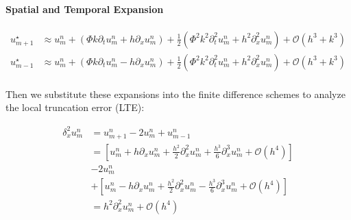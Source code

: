 \paragraph{Spatial and Temporal Expansion}
\begin{align*}
  u_{m+1}^\star & \approx u_m^n + \left(\Phi k \partial_t u_m^n + h \partial_x u_m^n\right) + \frac{1}{2}\left(\Phi^2 k^2 \partial_t^2 u_m^n + h^2 \partial_x^2 u_m^n\right) + \mathcal{O}(h^3 + k^3) \\
  u_{m-1}^\star & \approx u_m^n + \left(\Phi k \partial_t u_m^n - h \partial_x u_m^n\right) + \frac{1}{2}\left(\Phi^2 k^2 \partial_t^2 u_m^n + h^2 \partial_x^2 u_m^n\right) + \mathcal{O}(h^3 + k^3) \\
\end{align*}

Then we substitute these expansions into the finite difference schemes to analyze the local truncation error (LTE):

\begin{align*}
  \delta_x^2 u_m^n & = u_{m+1}^n - 2 u_m^n + u_{m-1}^n                                                                                                    \\
                   & = \left[ u_m^n + h \partial_x u_m^n + \frac{h^2}{2} \partial_x^2 u_m^n + \frac{h^3}{6} \partial_x^3 u_m^n + \mathcal{O}(h^4) \right] \\
                   & - 2 u_m^n                                                                                                                            \\
                   & + \left[ u_m^n - h \partial_x u_m^n + \frac{h^2}{2} \partial_x^2 u_m^n - \frac{h^3}{6} \partial_x^3 u_m^n + \mathcal{O}(h^4) \right] \\
                   & = h^2 \partial_x^2 u_m^n + \mathcal{O}(h^4)
\end{align*}

